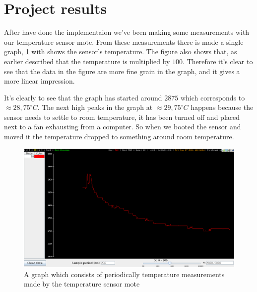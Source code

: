 \section{Project results}
After have done the implementaion we've been making some measurements with our
temperature sensor mote. From these measurements there is made a single graph,
\ref{fig:results} with shows the sensor's temperature. 
The figure also shows that, as earlier described that the temperature is multiplied by $100$.
Therefore it's clear to see that the data in the figure are more fine grain in
the graph, and it gives a more linear impression.

It's clearly to see that the graph has started around $2875$ which corresponds to $\approx 28,75 ^{\circ} C$. The next high peaks in the graph at $\approx 29,75 ^{\circ} C$ happens because the sensor needs to settle to room temperature, it has been turned off and placed next to a fan exhausting from a computer. So when we booted the sensor and moved it the temperature dropped to something around room temperature. 
\begin{landscape}
\begin{figure}[htbp]
\begin{center}
	\includegraphics[width=26cm,trim={0 0 0 14},clip=true]{img/graph}
\caption{A graph which consists of periodically temperature measurements made by the temperature sensor mote}
\label{fig:results}
\end{center}
\end{figure}
\end{landscape}